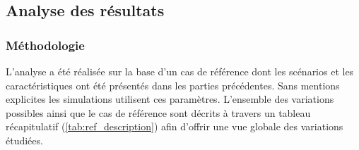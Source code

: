 \subsection{Analyse des résultats} %
\label{sub:analyse_des_resultats}
\subsubsection{Méthodologie} %
\label{ssub:methodologie}
L’analyse a été réalisée sur la base d’un cas de référence dont les scénarios et les
caractéristiques ont été présentés dans les parties précédentes. Sans mentions explicites les
simulations utilisent ces paramètres. L’ensemble des variations possibles ainsi que
le cas de référence sont décrits à travers un tableau récapitulatif (\autoref{tab:ref_description})
afin d’offrir une vue globale des variations étudiées.


